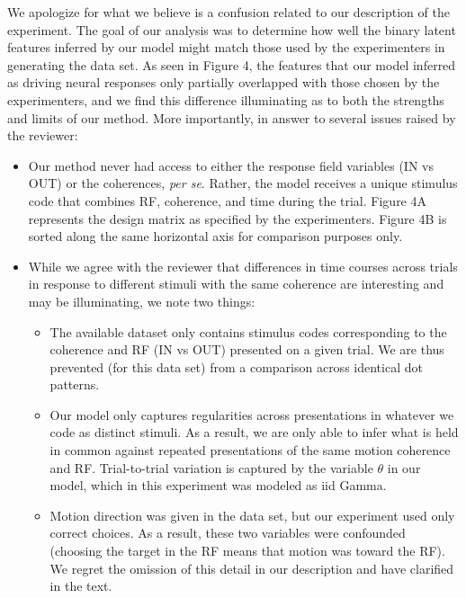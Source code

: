 \documentclass[12pt,a4paper]{article}
\newcommand{\edit}[1]{\textcolor{edit}{#1}}
\begin{document}
\begin{enumerate}
\edit{
We apologize for what we believe is a confusion related to our description of the experiment. The goal of our analysis was to determine how well the binary latent features inferred by our model might match those used by the experimenters in generating the data set. As seen in Figure 4, the features that our model inferred as driving neural responses only partially overlapped with those chosen by the experimenters, and we find this difference illuminating as to both the strengths and limits of our method. More importantly, in answer to several issues raised by the reviewer:
\begin{itemize}
    \item Our method never had access to either the response field variables (IN vs OUT) or the coherences, \emph{per se}. Rather, the model receives a unique stimulus code that combines RF, coherence, and time during the trial. Figure 4A represents the design matrix as specified by the experimenters. Figure 4B is sorted along the same horizontal axis for comparison purposes only.
    \item While we agree with the reviewer that differences in time courses across trials in response to different stimuli with the same coherence are interesting and may be illuminating, we note two things:
    \begin{itemize}
        \item The available dataset only contains stimulus codes corresponding to the coherence and RF (IN vs OUT) presented on a given trial. We are thus prevented (for this data set) from a comparison across identical dot patterns.
        \item Our model only captures regularities across presentations in whatever we code as distinct stimuli. As a result, we are only able to infer what is held in common against repeated presentations of the same motion coherence and RF. Trial-to-trial variation is captured by the variable $\theta$ in our model, which in this experiment was modeled as iid Gamma.
        \item Motion direction was given in the data set, but our experiment used only correct choices. As a result, these two variables were confounded (choosing the target in the RF means that motion was toward the RF). We regret the omission of this detail in our description and have clarified in the text.
    \end{itemize}
\end{itemize}
}
\end{enumerate}
\end{document}
